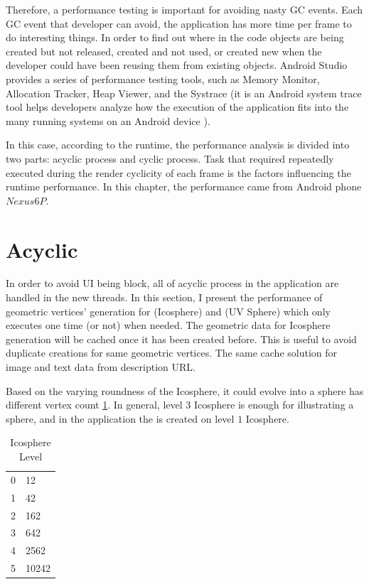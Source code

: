 Therefore, a performance testing is important for avoiding nasty GC events. Each GC event that developer can avoid, the application has more time per frame to do interesting things. In order to find out where in the code objects are being created but not released, created and not used, or created new when the developer could have been reusing them from existing objects. Android Studio provides a series of performance testing tools, such as Memory Monitor, Allocation Tracker, Heap Viewer, and the Systrace (it is an Android system trace tool helps developers analyze how the execution of the application fits into the many running systems on an Android device \cite{google.systrace.2016}).

In this case, according to the runtime, the performance analysis is divided into two parts: acyclic process and cyclic process. Task that required repeatedly executed during the render cyclicity of each frame is the factors influencing the runtime performance. In this chapter, the performance came from Android phone $Nexus 6P$.

\section{Acyclic}

In order to avoid UI being block, all of acyclic process in the application are handled in the new threads. In this section, I present the performance of geometric vertices' generation for  (Icosphere) and  (UV Sphere) which only executes one time (or not) when needed. The geometric data for Icosphere generation will be cached once it has been created before. This is useful to avoid duplicate creations for same geometric vertices. The same cache solution for image and text data from  description URL.

Based on the varying roundness of the Icosphere, it could evolve into a sphere has different vertex count \ref{tab:icosphere-level}. In general, level $3$ Icosphere is enough for illustrating a sphere, and in the application the  is created on level $1$ Icosphere.

\begin{table}[H]
	\caption{Icosphere Level}
	\label{tab:icosphere-level}
	\centering
	\begin{tabular}{l l}
		\toprule
		\tabhead{Recursion Level} & \tabhead{Vertex Count}\\
		\midrule
		0 & 12\\
		1 & 42\\
		2 & 162\\
		3 & 642\\
		4 & 2562\\
		5 & 10242\\
		\bottomrule
	\end{tabular}
\end{table}

